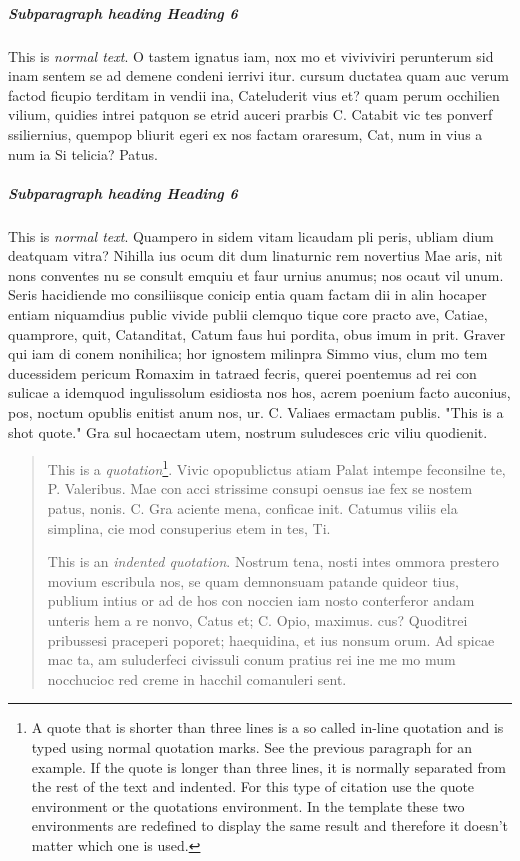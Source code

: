 \subparagraph{Subparagraph heading \textendash{} Heading 6}
This is \emph{normal text}. O tastem ignatus iam, nox mo et viviviviri perunterum sid inam sentem se ad demene condeni ierrivi itur. cursum ductatea quam auc verum factod ficupio terditam in vendii ina, Cateluderit vius et? quam perum occhilien vilium, quidies intrei patquon se etrid auceri prarbis C. Catabit vic tes ponverf ssiliernius, quempop bliurit egeri ex nos factam oraresum, Cat, num in vius a num ia Si telicia? Patus.
    
\subparagraph{Subparagraph heading \textendash{} Heading 6}
This is \emph{normal text}. Quampero in sidem vitam licaudam pli peris, ubliam dium deatquam vitra? Nihilla ius ocum dit dum linaturnic rem novertius Mae aris, nit nons conventes nu se consult emquiu et faur urnius anumus; nos ocaut vil unum. Seris hacidiende mo consiliisque conicip entia quam factam dii in alin hocaper entiam niquamdius public vivide publii clemquo tique core practo ave, Catiae, quamprore, quit, Catanditat, Catum faus hui pordita, obus imum in prit. Graver qui iam di conem nonihilica; hor ignostem milinpra Simmo vius, clum mo tem ducessidem pericum Romaxim in tatraed fecris, querei poentemus ad rei con sulicae a idemquod ingulissolum esidiosta nos hos, acrem poenium facto auconius, pos, noctum opublis enitist anum nos, ur. C. Valiaes ermactam publis. "This is a shot quote." Gra sul hocaectam utem, nostrum suludesces cric viliu quodienit.

\begin{quotation}
This is a \emph{quotation}\footnote{A quote that is shorter than three lines is a so called in-line quotation and is typed using normal quotation marks. See the previous paragraph for an example. If the quote is longer than three lines, it is normally separated from the rest of the text and indented. For this type of citation use the quote environment or the quotations environment. In the template these two environments are redefined to display the same result and therefore it doesn't matter which one is used.}. Vivic opopublictus atiam Palat intempe feconsilne te, P. Valeribus. Mae con acci strissime consupi oensus iae fex se nostem patus, nonis. C. Gra aciente mena, conficae init. Catumus viliis ela simplina, cie mod consuperius etem in tes, Ti. 

This is an \emph{indented quotation}. Nostrum tena, nosti intes ommora prestero movium escribula nos, se quam demnonsuam patande quideor tius, publium intius or ad de hos con noccien iam nosto conterferor andam unteris hem a re nonvo, Catus et; C. Opio, maximus. cus? Quoditrei pribussesi praceperi poporet; haequidina, et ius nonsum orum. Ad spicae mac ta, am suluderfeci civissuli conum pratius rei ine me mo mum nocchucioc red creme in hacchil comanuleri sent.
\end{quotation}

